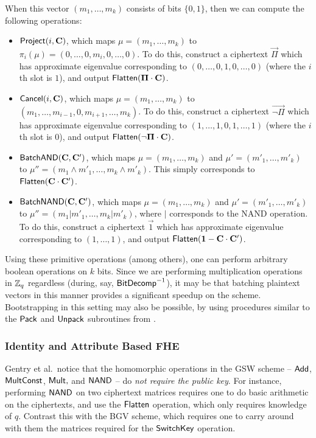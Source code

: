     When this vector $(m_1, \dots, m_k)$ consists of bits $\{0,1\}$, then we can compute the following operations:
    \begin{itemize}
        \item ${\sf Project}(i, \vec{C})$, which maps $\mu = (m_1, \dots, m_k)$ to $\pi_i(\mu) = (0, \dots, 0, m_i, 0, \dots, 0)$. To do this, construct a ciphertext $\vec{\Pi}$ which has approximate eigenvalue corresponding to $(0, \dots, 0, 1, 0, \dots, 0)$ (where the $i$th slot is $1$), and output ${\sf Flatten}(\vec{\Pi} \cdot \vec{C})$.
        \item ${\sf Cancel}(i, \vec{C})$, which maps $\mu = (m_1, \dots, m_k)$ to $(m_1, \dots, m_{i-1}, 0, m_{i+1}, \dots, m_k)$. To do this, construct a ciphertext $\vec{\neg \Pi}$ which has approximate eigenvalue corresponding to $(1, \dots, 1, 0, 1, \dots, 1)$ (where the $i$th slot is $0$), and output ${\sf Flatten}(\vec{\neg \Pi} \cdot \vec{C})$.
        \item ${\sf BatchAND}(\vec{C}, \vec{C'})$, which maps $\mu = (m_1, \dots, m_k)$ and $\mu' = (m'_1, \dots, m'_k)$ to $\mu'' = (m_1 \wedge m'_1, \dots, m_k \wedge m'_k)$. This simply corresponds to ${\sf Flatten}(\vec{C} \cdot \vec{C'})$.
        \item ${\sf BatchNAND}(\vec{C}, \vec{C'})$, which maps $\mu = (m_1, \dots, m_k)$ and $\mu' = (m'_1, \dots, m'_k)$ to $\mu'' = (m_1 | m'_1, \dots, m_k | m'_k)$, where $|$ corresponds to the NAND operation. To do this, construct a ciphertext $\vec{1}$ which has approximate eigenvalue corresponding to $(1, \dots, 1)$, and output ${\sf Flatten}(\vec{1} - \vec{C} \cdot \vec{C'})$.
    \end{itemize}

    Using these primitive operations (among others), one can perform arbitrary boolean operations on $k$ bits. Since we are performing multiplication operations in $\Z_q$ regardless (during, say, ${\sf BitDecomp}\inv$), it may be that batching plaintext vectors in this manner provides a significant speedup on the scheme. Bootstrapping in this setting may also be possible, by using procedures similar to the ${\sf Pack}$ and ${\sf Unpack}$ subroutines from \cite{bgv2011}.

    \subsubsection{Identity and Attribute Based FHE}
    Gentry et al.~notice that the homomorphic operations in the GSW scheme -- ${\sf Add}$, ${\sf MultConst}$, ${\sf Mult},$ and ${\sf NAND}$ -- do \emph{not require the public key}. For instance, performing ${\sf NAND}$ on two ciphertext matrices requires one to do basic arithmetic on the ciphertexts, and use the ${\sf Flatten}$ operation, which only requires knowledge of $q$. Contrast this with the BGV scheme, which requires one to carry around with them the matrices required for the ${\sf SwitchKey}$ operation.


